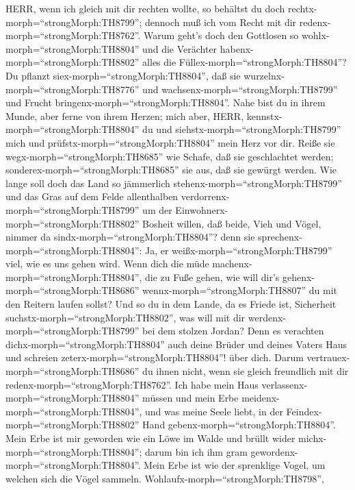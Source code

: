  HERR, wenn ich gleich mit dir rechten wollte, so behältst
du doch rechtx-morph=``strongMorph:TH8799''; dennoch muß ich vom Recht
mit dir redenx-morph=``strongMorph:TH8762''. Warum geht's doch den
Gottlosen so wohlx-morph=``strongMorph:TH8804'' und die Verächter
habenx-morph=``strongMorph:TH8802'' alles die
Füllex-morph=``strongMorph:TH8804''?  Du pflanzt
siex-morph=``strongMorph:TH8804'', daß sie
wurzelnx-morph=``strongMorph:TH8776'' und
wachsenx-morph=``strongMorph:TH8799'' und Frucht
bringenx-morph=``strongMorph:TH8804''. Nahe bist du in ihrem Munde, aber
ferne von ihrem Herzen;  mich aber, HERR,
kennstx-morph=``strongMorph:TH8804'' du und
siehstx-morph=``strongMorph:TH8799'' mich und
prüfstx-morph=``strongMorph:TH8804'' mein Herz vor dir. Reiße sie
wegx-morph=``strongMorph:TH8685'' wie Schafe, daß sie geschlachtet
werden; sonderex-morph=``strongMorph:TH8685'' sie aus, daß sie gewürgt
werden.  Wie lange soll doch das Land so jämmerlich
stehenx-morph=``strongMorph:TH8799'' und das Gras auf dem Felde
allenthalben verdorrenx-morph=``strongMorph:TH8799'' um der
Einwohnerx-morph=``strongMorph:TH8802'' Bosheit willen, daß beide, Vieh
und Vögel, nimmer da sindx-morph=``strongMorph:TH8804''? denn sie
sprechenx-morph=``strongMorph:TH8804'': Ja, er
weißx-morph=``strongMorph:TH8799'' viel, wie es uns gehen wird.
 Wenn dich die müde machenx-morph=``strongMorph:TH8804'',
die zu Fuße gehen, wie will dir's gehenx-morph=``strongMorph:TH8686''
wennx-morph=``strongMorph:TH8807'' du mit den Reitern laufen sollst? Und
so du in dem Lande, da es Friede ist, Sicherheit
suchstx-morph=``strongMorph:TH8802'', was will mit dir
werdenx-morph=``strongMorph:TH8799'' bei dem stolzen Jordan?
 Denn es verachten dichx-morph=``strongMorph:TH8804'' auch
deine Brüder und deines Vaters Haus und schreien
zeterx-morph=``strongMorph:TH8804''! über dich. Darum
vertrauex-morph=``strongMorph:TH8686'' du ihnen nicht, wenn sie gleich
freundlich mit dir redenx-morph=``strongMorph:TH8762''.  Ich
habe mein Haus verlassenx-morph=``strongMorph:TH8804'' müssen und mein
Erbe meidenx-morph=``strongMorph:TH8804'', und was meine Seele liebt, in
der Feindex-morph=``strongMorph:TH8802'' Hand
gebenx-morph=``strongMorph:TH8804''.  Mein Erbe ist mir
geworden wie ein Löwe im Walde und brüllt wider
michx-morph=``strongMorph:TH8804''; darum bin ich ihm gram
gewordenx-morph=``strongMorph:TH8804''.  Mein Erbe ist wie
der sprenklige Vogel, um welchen sich die Vögel sammeln.
Wohlaufx-morph=``strongMorph:TH8798'',
